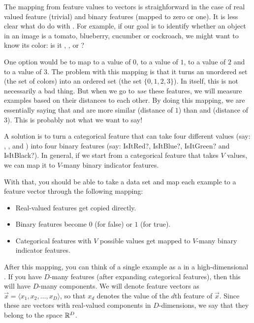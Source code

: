 
The mapping from feature values to vectors is straighforward in the
case of real valued feature (trivial) and binary features (mapped to
zero or one).  It is less clear what do do with . For example, if our goal is to identify whether an object
in an image is a tomato, blueberry, cucumber or cockroach, we might
want to know its color: is it , , 
or ?

One option would be to map  to a value of $0$, 
to a value of $1$,  to a value of $2$ and 
to a value of $3$.  The problem with this mapping is that it turns an
unordered set (the set of colors) into an ordered set (the set
$\{0,1,2,3\}$).  In itself, this is not necessarily a bad thing.  But
when we go to \emph{use} these features, we will measure examples
based on their distances to each other.  By doing this mapping, we are
essentially saying that  and  are more similar
(distance of $1$) than  and  (distance of
$3$).  This is probably not what we want to say!

A solution is to turn a categorical feature that can take four
different values (say: , ,  and
) into four binary features (say: IsItRed?, IsItBlue?,
IsItGreen? and IsItBlack?).  In general, if we start from a
categorical feature that takes $V$ values, we can map it to $V$-many
binary indicator features.


With that, you should be able to take a data set and map each example
to a feature vector through the following mapping:

\begin{itemize}
\item Real-valued features get copied directly.
\item Binary features become $0$ (for false) or $1$ (for true).
\item Categorical features with $V$ possible values get mapped to
  $V$-many binary indicator features.
\end{itemize}

After this mapping, you can think of a single example as a
 in a high-dimensional .  If
you have $D$-many features (after expanding categorical features),
then this  will have $D$-many components.  We
will denote feature vectors as $\vec x = \langle x_1, x_2, \dots, x_D
\rangle$, so that $x_d$ denotes the value of the $d$th feature of
$\vec x$.  Since these are vectors with real-valued components in
$D$-dimensions, we say that they belong to the space $\mathbb{R}^D$.

